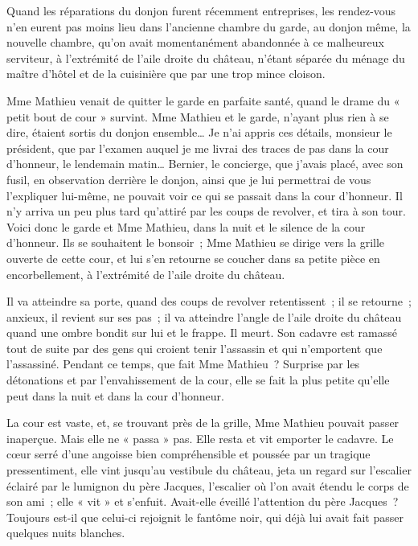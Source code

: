 \documentclass{frscenario}
\begin{document}
\coupe

Quand les réparations du donjon furent récemment entreprises, les rendez-vous n’en eurent pas moins lieu dans l’ancienne chambre du garde, au donjon même, la nouvelle chambre, qu’on avait momentanément abandonnée à ce malheureux serviteur, à l’extrémité de l’aile droite du château, n’étant séparée du ménage du maître d’hôtel et de la cuisinière que par une trop mince cloison.

Mme Mathieu venait de quitter le garde en parfaite santé, quand le drame du « petit bout de cour » survint. Mme Mathieu et le garde, n’ayant plus rien à se dire, étaient sortis du donjon ensemble… Je n’ai appris ces détails, monsieur le président, que par l’examen auquel je me livrai des traces de pas dans la cour d’honneur, le lendemain matin… Bernier, le concierge, que j’avais placé, avec son fusil, en observation derrière le donjon, ainsi que je lui permettrai de vous l’expliquer lui-même, ne pouvait voir ce qui se passait dans la cour d’honneur. Il n’y arriva un peu plus tard qu’attiré par les coups de revolver, et tira à son tour. Voici donc le garde et Mme Mathieu, dans la nuit et le silence de la cour d’honneur. Ils se souhaitent le bonsoir ; Mme Mathieu se dirige vers la grille ouverte de cette cour, et lui s’en retourne se coucher dans sa petite pièce en encorbellement, à l’extrémité de l’aile droite du château.

\coupe

Il va atteindre sa porte, quand des coups de revolver retentissent ; il se retourne ; anxieux, il revient sur ses pas ; il va atteindre l’angle de l’aile droite du château quand une ombre bondit sur lui et le frappe. Il meurt. Son cadavre est ramassé tout de suite par des gens qui croient tenir l’assassin et qui n’emportent que l’assassiné. Pendant ce temps, que fait Mme Mathieu ? Surprise par les détonations et par l’envahissement de la cour, elle se fait la plus petite qu’elle peut dans la nuit et dans la cour d’honneur.

La cour est vaste, et, se trouvant près de la grille, Mme Mathieu pouvait passer inaperçue. Mais elle ne « passa » pas. Elle resta et vit emporter le cadavre. Le cœur serré d’une angoisse bien compréhensible et poussée par un tragique pressentiment, elle vint jusqu’au vestibule du château, jeta un regard sur l’escalier éclairé par le lumignon du père Jacques, l’escalier où l’on avait étendu le corps de son ami ; elle « vit » et s’enfuit. Avait-elle éveillé l’attention du père Jacques ? Toujours est-il que celui-ci rejoignit le fantôme noir, qui déjà lui avait fait passer quelques nuits blanches.
\end{document}
